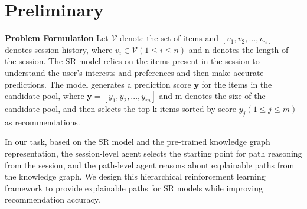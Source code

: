 \documentclass[10pt,journal,compsoc]{IEEEtran}
\begin{document}
\begin{table}[h]
\centering
\caption{Statistics of the relations on the Douban-movie.}
\label{table2}
\end{table}


\section{Preliminary}

\textbf{Problem Formulation} \quad Let $\mathcal{V}$ denote the set of items and $[v_1,v_2, ...,v_n]$ denotes session history, where $v_i\in \mathcal{V} (1\leq i\leq n)$ and n denotes the length of the session. The SR model relies on the items present in the session to understand the user's interests and preferences and then make accurate predictions. The model generates a prediction score $\mathbf{y}$ for the items in the candidate pool, where $\mathbf{y}=[y_1,y_2,...,y_m]$ and m denotes the size of the candidate pool, and then selects the top k items sorted by score $y_j (1\leq j\leq m)$ as recommendations.

In our task, based on the SR model and the pre-trained knowledge graph representation, the session-level agent selects the starting point for path reasoning from the session, and the path-level agent reasons about explainable paths from the knowledge graph. We design this hierarchical reinforcement learning framework to provide explainable paths for SR models while improving recommendation accuracy.
\end{document}

